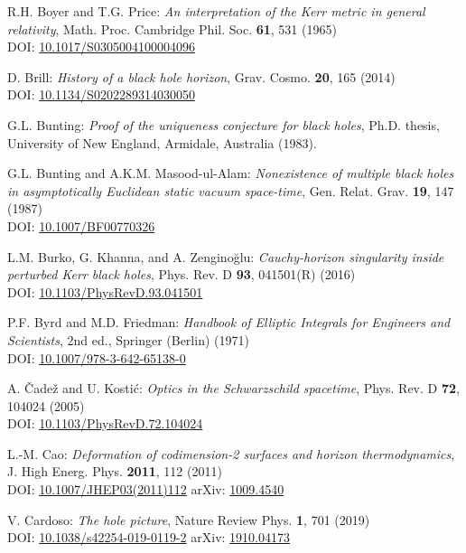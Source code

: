 \begin{thebibliography}{123}
R.H. Boyer and T.G. Price: {\em An interpretation of the Kerr metric in general relativity},
Math. Proc. Cambridge Phil. Soc. {\bf 61}, 531 (1965)\\
DOI: \href{https://doi.org/10.1017/S0305004100004096}{10.1017/S0305004100004096}

D. Brill: {\em History of a black hole horizon},
Grav. Cosmo. {\bf 20}, 165 (2014) \\
DOI: \href{https://doi.org/10.1134/S0202289314030050}{10.1134/S0202289314030050}

G.L. Bunting:
{\em Proof of the uniqueness conjecture for black holes},
Ph.D. thesis, University of New England, Armidale, Australia (1983).

G.L. Bunting and A.K.M. Masood-ul-Alam:
{\em Nonexistence of multiple black holes in asymptotically Euclidean static vacuum space-time},
Gen. Relat. Grav. {\bf 19}, 147 (1987)\\
DOI: \href{https://doi.org/10.1007/BF00770326}{10.1007/BF00770326}

L.M. Burko, G. Khanna, and A. Zenginoğlu: {\em
Cauchy-horizon singularity inside perturbed Kerr black holes},
Phys. Rev. D {\bf 93}, 041501(R) (2016) \\
DOI: \href{https://doi.org/10.1103/PhysRevD.93.041501}{10.1103/PhysRevD.93.041501}

P.F. Byrd and M.D. Friedman:
{\em Handbook of Elliptic Integrals for Engineers and Scientists},
2nd ed., Springer (Berlin) (1971)\\
DOI: \href{https://doi.org/10.1007/978-3-642-65138-0}{10.1007/978-3-642-65138-0}

A. \v{C}ade\v{z} and U. Kosti\'c:
{\em Optics in the Schwarzschild spacetime},
Phys. Rev. D {\bf 72}, 104024 (2005)\\
DOI: \href{https://doi.org/10.1103/PhysRevD.72.104024}{10.1103/PhysRevD.72.104024}

L.-M. Cao:
{\em Deformation of codimension-2 surfaces and horizon thermodynamics},
J. High Energ. Phys. {\bf 2011}, 112 (2011)\\
DOI: \href{https://doi.org/10.1007/JHEP03(2011)112}{10.1007/JHEP03(2011)112}\hfill
arXiv: \href{https://arxiv.org/abs/1009.4540}{1009.4540}

V. Cardoso:
{\em The hole picture},
Nature Review Phys. {\bf 1}, 701 (2019)\\
DOI: \href{https://doi.org/10.1038/s42254-019-0119-2}{10.1038/s42254-019-0119-2}\hfill
arXiv: \href{https://arxiv.org/abs/1910.04173}{1910.04173}


\end{thebibliography}

